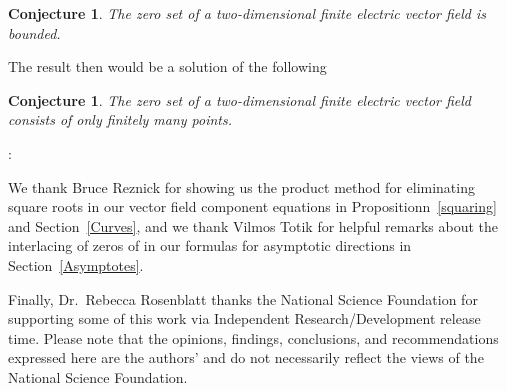 \documentclass{article}
\newtheorem{conj}[thm]{Conjecture}
\theoremstyle{remark}
\numberwithin{equation}{section}
\begin{document}
\begin{conj} The zero set of a two-dimensional finite electric vector field is bounded. 
\end{conj}

\noindent The result then would be a solution of the following

\begin{conj} The zero set of a two-dimensional finite electric vector field consists of only finitely many points.
\end{conj}
\smallskip
{}: 

We thank Bruce Reznick for showing us the product method for eliminating square roots in our vector field component equations in Propositionn~\ref{squaring} 
and Section~\ref{Curves}, and we thank Vilmos Totik for helpful remarks about the interlacing of zeros of in our formulas for asymptotic directions in Section~\ref{Asymptotes}. 

Finally, Dr.~Rebecca Rosenblatt thanks the National Science Foundation for supporting some of this work via Independent Research/Development release time. 
Please note that the opinions, findings, conclusions, and recommendations expressed here are the authors' and do not necessarily reflect the views of the National Science Foundation.


\end{document}
